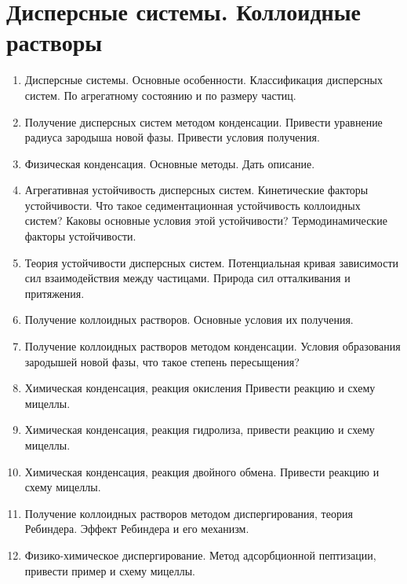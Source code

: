 \section{Дисперсные системы. Коллоидные растворы}
\begin{enumerate}
\item
Дисперсные системы. Основные особенности. Классификация дисперсных систем. По агрегатному состоянию и по размеру частиц.
 
\item
Получение дисперсных систем методом конденсации. Привести уравнение радиуса зародыша новой фазы. Привести условия получения.
 
\item
Физическая конденсация. Основные методы. Дать описание.
 
\item
Агрегативная устойчивость дисперсных систем. Кинетические факторы устойчивости. Что такое седиментационная устойчивость коллоидных систем? Каковы основные условия этой устойчивости? Термодинамические факторы устойчивости.
 
\item
Теория устойчивости дисперсных систем. Потенциальная кривая зависимости сил взаимодействия между частицами. Природа сил отталкивания и притяжения.
 
\item
Получение коллоидных растворов. Основные условия их получения.
 
\item
Получение коллоидных растворов методом конденсации. Условия образования зародышей новой фазы, что такое степень пересыщения?
 
\item
Химическая конденсация, реакция окисления Привести реакцию и схему мицеллы.
 
\item
Химическая конденсация, реакция гидролиза, привести реакцию и схему мицеллы.
 
\item
Химическая конденсация, реакция двойного обмена. Привести реакцию и схему мицеллы.
 
\item
Получение коллоидных растворов методом диспергирования, теория Ребиндера. Эффект Ребиндера и его механизм.
 
\item
Физико-химическое диспергирование. Метод адсорбционной пептизации, привести пример и схему мицеллы.
 

\end{enumerate}
